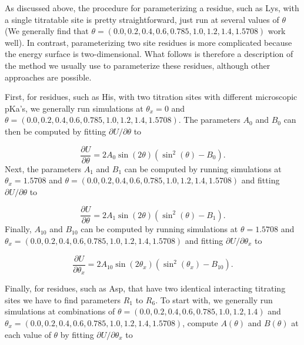 \documentclass[9pt,tutorial]{livecoms}
\begin{document}
As discussed above, the procedure for parameterizing a residue, such as Lys, with a single titratable site is pretty straightforward, just run at several values of $\theta$ (We generally find that $\theta=\left(0.0,0.2,0.4,0.6,0.785,1.0,1.2,1.4,1.5708\right)$ work well). In contrast, parameterizing two site residues is more complicated because the energy surface is two-dimensional. What follows is therefore a description of the method we usually use to parameterize these residues, although other approaches are possible.

First, for residues, such as His, with two titration sites with different microscopic pKa's, we generally run simulations at $\theta_{x}=0$ and $\theta=\left(0.0,0.2,0.4,0.6,0.785,1.0,1.2,1.4,1.5708\right)$. The parameters $A_{0}$ and $B_{0}$ can then be computed by fitting $\partial U/\partial\theta$ to

\begin{equation}
    \frac{\partial U}{\partial\theta}=2A_{0}\sin\left(2\theta\right)\left(\sin^{2}\left(\theta\right)-B_{0}\right).
\end{equation}
Next, the parameters $A_{1}$ and $B_{1}$ can be computed by running simulations at $\theta_{x}=1.5708$ and $\theta=\left(0.0,0.2,0.4,0.6,0.785,1.0,1.2,1.4,1.5708\right)$ and fitting $\partial U/\partial\theta$ to

\begin{equation}
    \frac{\partial U}{\partial\theta}=2A_{1}\sin\left(2\theta\right)\left(\sin^{2}\left(\theta\right)-B_{1}\right).
\end{equation}
Finally, $A_{10}$ and $B_{10}$ can be computed by running simulations at $\theta=1.5708$ and $\theta_{x}=\left(0.0,0.2,0.4,0.6,0.785,1.0,1.2,1.4,1.5708\right)$ and fitting $\partial U/\partial\theta_{x}$ to

\begin{equation}
    \frac{\partial U}{\partial\theta_{x}}=2A_{10}\sin\left(2\theta_{x}\right)\left(\sin^{2}\left(\theta_{x}\right)-B_{10}\right).
\end{equation}

Finally, for residues, such as Asp, that have two identical interacting titrating sites we have to find parameters $R_{1}$ to $R_{6}$. To start with, we generally run simulations at combinations of $\theta=\left(0.0,0.2,0.4,0.6,0.785,1.0,1.2,1.4\right)$ and  $\theta_{x}=\left(0.0,0.2,0.4,0.6,0.785,1.0,1.2,1.4,1.5708\right)$, compute $A\left(\theta\right)$ and $B\left(\theta\right)$ at each value of $\theta$ by fitting $\partial U/\partial\theta_{x}$ to
\end{document}
